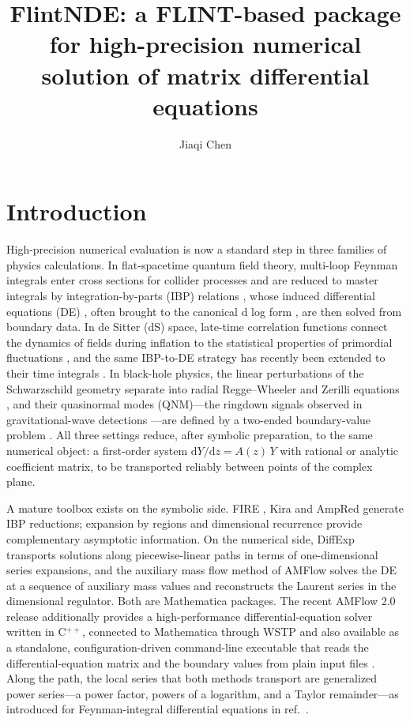 \documentclass[11pt,a4paper]{article}
\title{\bf FlintNDE: a FLINT-based package for high-precision numerical
solution of matrix differential equations}
\author[a,b]{Jiaqi Chen}
\affiliation[a]{Beijing Key Laboratory of Optical Detection Technology for Oil and Gas,
China University of Petroleum-Beijing, Beijing 102249, China}
\affiliation[b]{Basic Research Center for Energy Interdisciplinary, College of Science,
China University of Petroleum-Beijing, Beijing 102249, China}
\newcommand{\dd}{\mathrm d}
\begin{document}
\maketitle

\section{Introduction}
\label{sec:introduction}

High-precision numerical evaluation is now a standard step in three families of physics
calculations. In flat-spacetime quantum field theory, multi-loop Feynman integrals enter
cross sections for collider processes and are reduced to master integrals by
integration-by-parts (IBP) relations \cite{Chetyrkin:1981qh}, whose induced differential equations (DE)
\cite{Kotikov:1990kg,Kotikov:1991pm,Bern:1993kr,Gehrmann:1999as}, often brought to the
canonical d log form \cite{Henn:2013pwa}, are then
solved from boundary data. In de Sitter (dS) space, late-time correlation functions connect
the dynamics of fields during inflation to the statistical properties of primordial
fluctuations \cite{Chen:2017ryl,Arkani-Hamed:2018kmz,Xianyu:2023ytd}, and the same
IBP-to-DE strategy has recently been extended to their time integrals
\cite{Chen:2023iix,Chen:2024glu,Chen:2026dqp}. In black-hole physics, the linear
perturbations of the Schwarzschild geometry separate into radial Regge--Wheeler and Zerilli
equations \cite{Regge:1957td,Zerilli:1970se}, and their quasinormal modes (QNM)---the
ringdown signals observed in gravitational-wave detections
\cite{LIGOScientific:2016aoc}---are defined by a two-ended boundary-value problem
\cite{Leaver:1985ax,Berti:2009kk}. All three settings reduce, after symbolic preparation,
to the same numerical object: a first-order system
$\dd Y/\dd z=A(z)\,Y$ with rational or analytic coefficient matrix, to be transported
reliably between points of the complex plane.

A mature toolbox exists on the symbolic side. FIRE \cite{Smirnov:2019qkx,Smirnov:2025prc},
Kira \cite{Maierhofer:2017gsa,Klappert:2020nbg,Lange:2025fba} and AmpRed
\cite{Chen:2024xwt} generate IBP reductions; expansion by regions
\cite{Beneke:1997zp,Pak:2010pt} and dimensional recurrence \cite{Lee:2010wea} provide
complementary asymptotic information. On the numerical side, DiffExp
\cite{Hidding:2020ytt} transports solutions along piecewise-linear paths in terms of
one-dimensional series expansions, and the auxiliary mass flow method of AMFlow
\cite{Liu:2017jxz,Liu:2020kpc,Liu:2022chg} solves the DE at a sequence of auxiliary mass
values and reconstructs the Laurent series in the dimensional regulator. Both are
Mathematica packages. The recent AMFlow 2.0 release additionally provides a
high-performance differential-equation solver written in C$^{++}$, connected to Mathematica
through WSTP and also available as a standalone, configuration-driven command-line
executable that reads the differential-equation matrix and the boundary values from plain
input files \cite{Huang:2026rjb}. Along the path, the local series that both methods
transport are generalized power series---a power factor, powers of a logarithm, and a
Taylor remainder---as introduced for Feynman-integral differential equations in
ref.~\cite{Moriello:2019yhu}.
\end{document}
